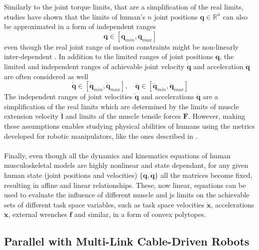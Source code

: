 Similarly to the joint torque limits, that are a simplification of the real limits, studies have shown that the limits of human's $n$ joint positions $\bm{q} \in \mathbb{R}^n$ can also be approximated in a form of independent ranges \cite{SOUCIE2011}
\begin{equation}
    \bm{q} \in  [\bm{q}_{min}, \bm{q}_{max} ]
    \label{eq:human_js_pos_range}
\end{equation}
even though the real joint range of motion constraints might be non-linearly inter-dependent \cite{Kane2014}.
In addition to the limited ranges of joint positions $\bm{q}$, the limited and independent ranges of achievable joint velocity $\dot{\bm{q}}$ and acceleration $\ddot{\bm{q}}$ are often considered as well \cite{Grimmer2020}
\begin{equation}
    \dot{\bm{q}} \in  [\dot{\bm{q}}_{min}, \dot{\bm{q}}_{max} ], \quad \ddot{\bm{q}} \in  [\ddot{\bm{q}}_{min}, \ddot{\bm{q}}_{max} ]
    \label{eq:human_js_vel_lim}
\end{equation}
The independent ranges of joint velocities $\dot{\bm{q}}$ and accelerations $\ddot{\bm{q}}$ are a simplification of the real limits which are determined by the limits of muscle extension velocity $\dot{\bm{l}}$ and limits of the muscle tensile forces $\bm{F}$. However, making these assumptions enables studying physical abilities of humans using the metrics developed for robotic manipulators, like the ones described in . 



\paragraph*{} Finally, even though all the dynamics and kinematics equations of human musculoskeletal models are highly nonlinear and state dependant, for any given human state (joint positions and velocities) $\{\bm{q},\dot{\bm{q}}\}$ all the matrices become fixed, resulting in affine and linear relationships. 
These, now linear, equations can be used to evaluate the influence of different muscle and \gls{js} limits on the achievable sets of different task space variables, such as task space velocities $\dot{\bm{x}}$, accelerations $\ddot{\bm{x}}$,  external wrenches $\bm{f}$ and similar, in a form of convex polytopes. 


\subsection{Parallel with Multi-Link Cable-Driven Robots}

